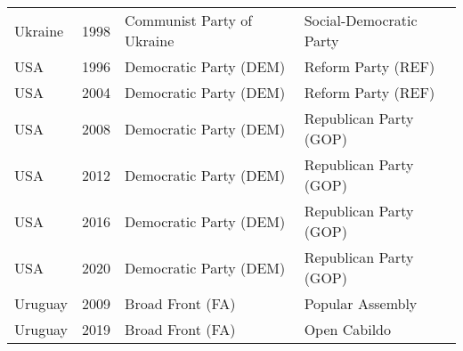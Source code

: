 {\begin{longtable}{|l|c|l|l|}
  Ukraine & 1998 &   Communist Party of Ukraine &   Social-Democratic Party \\ 
  USA & 1996 &   Democratic Party (DEM) &   Reform Party (REF) \\ 
    USA& 2004 &   Democratic Party (DEM) &   Reform Party (REF) \\ 
    USA& 2008 &   Democratic Party (DEM) &   Republican Party (GOP) \\ 
    USA & 2012 &   Democratic Party (DEM) &   Republican Party (GOP) \\ 
    USA & 2016 &   Democratic Party (DEM) &   Republican Party (GOP) \\ 
    USA & 2020 &   Democratic Party (DEM) &   Republican Party (GOP) \\ 
   Uruguay & 2009 &   Broad Front (FA) &   Popular Assembly \\ 
   Uruguay & 2019 &   Broad Front (FA) &   Open Cabildo \\ 
  \bottomrule
	\end{longtable} }